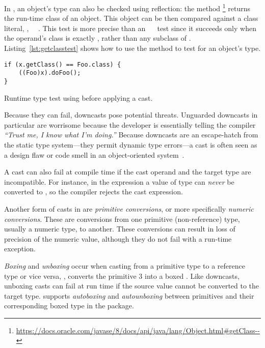 In \java{}, an object's type can also be checked using reflection:
the  method%
\footnote{\url{https://docs.oracle.com/javase/8/docs/api/java/lang/Object.html\#getClass--}}
returns the run-time class of an object.
This  object can be then compared against a class literal, \eg,
~\code{==}~.
This test is more precise than an ~~ test since it succeeds only when the operand's class is exactly ,
rather than any subclass of .
Listing~\ref{lst:getclasstest} shows how to use the  method to test for an object's type.

\begin{listing}
\begin{verbatim}
if (x.getClass() == Foo.class) {
	((Foo)x).doFoo(); 
}
\end{verbatim}
\caption{Runtime type test using  before applying a cast.}
\label{lst:getclasstest}
\end{listing}

Because they can fail,
downcasts pose potential threats.
Unguarded downcasts in particular are
worrisome because the developer is essentially telling the compiler
\emph{``Trust me, I know what I'm doing.''}
Because downcasts are an escape-hatch from the static type system---they
permit dynamic type errors---a cast is often seen as a design flaw or code
smell in an object-oriented system~\citep{tufanoWhenWhyYour2015}.

A cast can also fail at compile time if the cast operand and the target type are incompatible.
For instance, in the expression  a value of type
 can \emph{never} be converted to , so the compiler
rejects the cast expression.

Another form of casts in \java{} are \emph{primitive conversions}, or more specifically
\emph{numeric conversions}. These are conversions from
one primitive (non-reference) type, usually a numeric type, to another. These conversions can result
in loss of precision of the numeric value, although they do not fail with a
run-time exception.

\emph{Boxing} and \emph{unboxing} occur when casting from a primitive type to
a reference type or vice versa, \eg,  converts the primitive
 3 into a boxed .
Like downcasts, unboxing casts can fail at
run time if the source value cannot be converted to the target type.
\java{} supports \emph{autoboxing} and \emph{autounboxing} between primitives and their corresponding
boxed type in the  package.

